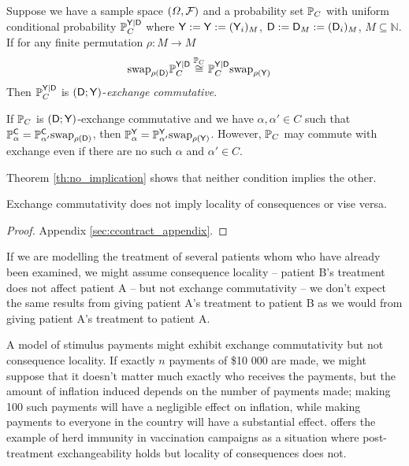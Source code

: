 \begin{definition}\label{def:caus_exch}
Suppose we have a sample space $(\Omega,\mathcal{F})$ and a probability set $\mathbb{P}_C$ with uniform conditional probability $\mathbb{P}_C^{\mathsf{Y}|\mathsf{D}}$ where $\mathsf{Y}:=\mathsf{Y}:=(\mathsf{Y}_i)_{M}$, $\mathsf{D}:=\mathsf{D}_M:=(\mathsf{D}_i)_M$, $M\subseteq \mathbb{N}$. If for any finite permutation $\rho:M\to M$
\begin{align}
    \text{swap}_{\rho(\mathsf{D})} \mathbb{P}_{C}^{\mathsf{Y}|\mathsf{D}} &\overset{\mathbb{P}_C}{\cong} \mathbb{P}_{C}^{\mathsf{Y}|\mathsf{D}}\text{swap}_{\rho(\mathsf{Y})}
\end{align}
Then $\mathbb{P}_C^{\mathsf{Y}|\mathsf{D}}$ is $(\mathsf{D};\mathsf{Y})$-\emph{exchange commutative}.
\end{definition}

If $\mathbb{P}_C$ is $(\mathsf{D};\mathsf{Y})$-exchange commutative and we have $\alpha,\alpha'\in C$ such that $\mathbb{P}_\alpha^{\mathsf{C}} = \mathbb{P}_{\alpha'}^{\mathsf{C}}\text{swap}_{\rho(\mathsf{D})}$, then $\mathbb{P}_\alpha^{\mathsf{Y}} = \mathbb{P}_{\alpha'}^{\mathsf{Y}}\text{swap}_{\rho(\mathsf{Y})}$. However, $\mathbb{P}_C$ may commute with exchange even if there are no such $\alpha$ and $\alpha'\in C$.

Theorem \ref{th:no_implication} shows that neither condition implies the other. 

\begin{theorem}\label{th:no_implication}
Exchange commutativity does not imply locality of consequences or vise versa.
\end{theorem}

\begin{proof}
Appendix \ref{sec:ccontract_appendix}.
\end{proof}

If we are modelling the treatment of several patients whom who have already been examined, we might assume consequence locality -- patient B's treatment does not affect patient A -- but not exchange commutativity -- we don't expect the same results from giving patient A's treatment to patient B as we would from giving patient A's treatment to patient A. 

A model of stimulus payments might exhibit exchange commutativity but not consequence locality. If exactly $n$ payments of \$10 000 are made, we might suppose that it doesn't matter much exactly who receives the payments, but the amount of inflation induced depends on the number of payments made; making 100 such payments will have a negligible effect on inflation, while making payments to everyone in the country will have a substantial effect. \citet{dawid_causal_2000} offers the example of herd immunity in vaccination campaigns as a situation where post-treatment exchangeability holds but locality of consequences does not.

